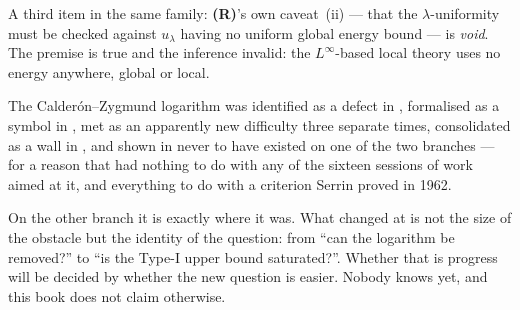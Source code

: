 A third item in the same family: \textbf{(R)}'s own caveat~(ii) --- that the
\(\lambda\)-uniformity must be checked against \(u_\lambda\) having no uniform
global energy bound --- is \emph{void}. The premise is true and the inference
invalid: the \(L^\infty\)-based local theory uses no energy anywhere, global
or local.

\begin{obsv}
\label{obs:cz-shape}
The Calder\'on--Zygmund logarithm was identified as a defect in ,
formalised as a symbol in , met as an apparently new difficulty three
separate times, consolidated as a wall in , and shown in  never
to have existed on one of the two branches --- for a reason that had nothing
to do with any of the sixteen sessions of work aimed at it, and everything to
do with a criterion Serrin proved in 1962.

\smallskip
On the other branch it is exactly where it was. What changed at  is not
the size of the obstacle but the identity of the question: from ``can the
logarithm be removed?'' to ``is the Type-I upper bound saturated?''. Whether
that is progress will be decided by whether the new question is easier. Nobody
knows yet, and this book does not claim otherwise.
\end{obsv}
